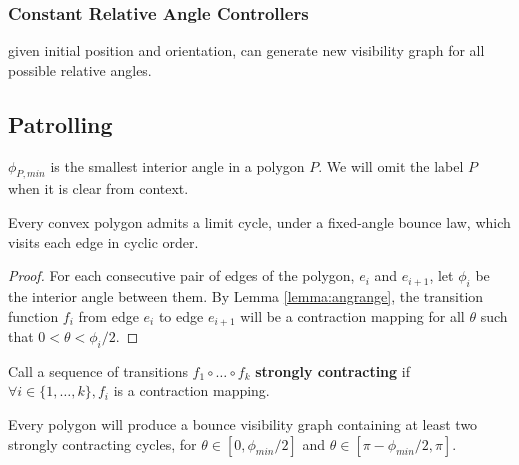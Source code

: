 \documentclass[]{styles/svproc}  %
\begin{document}
\subsubsection{Constant Relative Angle Controllers}

given initial position and orientation, can generate new visibility graph for
all possible relative angles.

\subsection{Patrolling \label{sec:cycles}}

\begin{definition}
$\phi_{P,min}$ is the smallest interior angle in a polygon $P$. We will omit the
label $P$ when it is clear from context.
\end{definition}

\begin{proposition}
Every convex polygon admits a limit cycle, under a fixed-angle bounce law, 
which visits each edge in cyclic order.
\end{proposition}

\begin{proof}

For each consecutive pair of edges of the polygon, $e_i$ and $e_{i+1}$, let
$\phi_i$ be the interior angle between them. By Lemma \ref{lemma:angrange}, the
transition function $f_i$ from edge $e_i$ to edge $e_{i+1}$ will be a
contraction mapping for all $\theta$ such that $0 < \theta < \phi_i/2$.


\end{proof}

\begin{definition}
Call a sequence of transitions $f_1 \circ \ldots \circ f_k$ \textbf{strongly
contracting} if $\forall i \in \{1, \ldots, k\}, f_i$ is a contraction mapping.
\end{definition}

\begin{corollary}
Every polygon will produce a bounce visibility graph containing at least two
strongly contracting cycles, for $\theta \in [0, \phi_{min}/2]$ and $\theta \in
[\pi - \phi_{min}/2, \pi]$.
\end{corollary}
\end{document}
